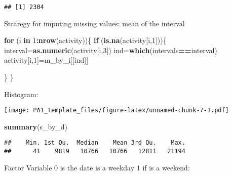 \documentclass[
]{article}
\newenvironment{Shaded}{\begin{snugshade}}{\end{snugshade}}
\newcommand{\ControlFlowTok}[1]{\textcolor[rgb]{0.13,0.29,0.53}{\textbf{#1}}}
\newcommand{\DataTypeTok}[1]{\textcolor[rgb]{0.13,0.29,0.53}{#1}}
\newcommand{\DecValTok}[1]{\textcolor[rgb]{0.00,0.00,0.81}{#1}}
\newcommand{\KeywordTok}[1]{\textcolor[rgb]{0.13,0.29,0.53}{\textbf{#1}}}
\newcommand{\NormalTok}[1]{#1}
\newcommand{\OperatorTok}[1]{\textcolor[rgb]{0.81,0.36,0.00}{\textbf{#1}}}
\newcommand{\StringTok}[1]{\textcolor[rgb]{0.31,0.60,0.02}{#1}}
\begin{document}
\begin{verbatim}
## [1] 2304
\end{verbatim}

Straregy for imputing missing values: mean of the interval

\begin{Shaded}
\begin{Highlighting}[]
\ControlFlowTok{for}\NormalTok{ (i }\ControlFlowTok{in} \DecValTok{1}\OperatorTok{:}\KeywordTok{nrow}\NormalTok{(activity))\{}
  \ControlFlowTok{if}\NormalTok{ (}\KeywordTok{is.na}\NormalTok{(activity[i,}\DecValTok{1}\NormalTok{]))\{}
\NormalTok{    interval=}\KeywordTok{as.numeric}\NormalTok{(activity[i,}\DecValTok{3}\NormalTok{])}
\NormalTok{    ind=}\KeywordTok{which}\NormalTok{(intervals}\OperatorTok{==}\NormalTok{interval)}
\NormalTok{    activity[i,}\DecValTok{1}\NormalTok{]=m_by_i[[ind]]}
    
\NormalTok{  \}}
\NormalTok{\}}
\end{Highlighting}
\end{Shaded}

Histogram:

\begin{Shaded}
\end{Shaded}

\texttt{[image: PA1\_template\_files/figure-latex/unnamed-chunk-7-1.pdf]}

\begin{Shaded}
\begin{Highlighting}[]
\KeywordTok{summary}\NormalTok{(s_by_d)}
\end{Highlighting}
\end{Shaded}

\begin{verbatim}
##    Min. 1st Qu.  Median    Mean 3rd Qu.    Max. 
##      41    9819   10766   10766   12811   21194
\end{verbatim}

Factor Variable 0 is the date is a weekday 1 if is a weekend:
\end{document}
